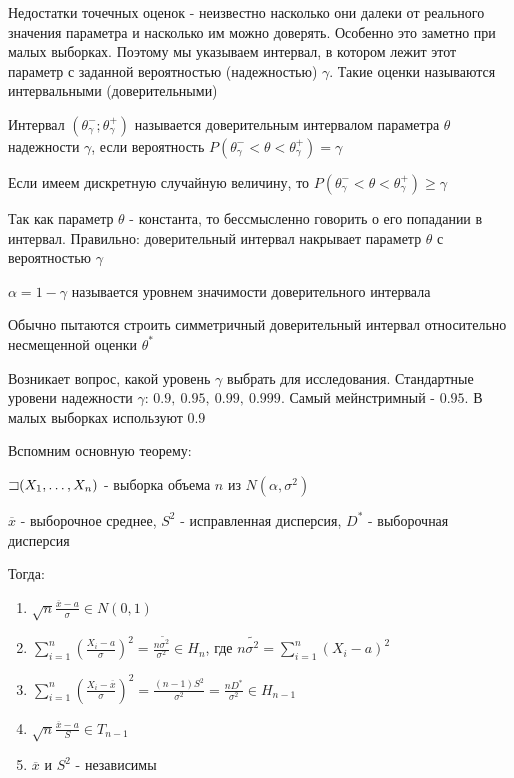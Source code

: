 \documentclass[12pt]{article}
\begin{document}
Недостатки точечных оценок - неизвестно насколько они далеки от реального значения параметра и 
насколько им можно доверять. Особенно это заметно при малых выборках. Поэтому мы указываем интервал, в котором 
лежит этот параметр с заданной вероятностью (надежностью) $\gamma$. Такие оценки называются интервальными 
(доверительными)

\Def Интервал $(\theta^-_\gamma; \theta^+_\gamma)$ называется доверительным интервалом параметра $\theta$
надежности $\gamma$, если вероятность $P(\theta^-_\gamma < \theta < \theta^+_\gamma) = \gamma$

\Nota Если имеем дискретную случайную величину, то $P(\theta^-_\gamma < \theta < \theta^+_\gamma) \geq \gamma$

\Notas Так как параметр $\theta$ - константа, то бессмысленно говорить о его попадании в интервал. Правильно: 
доверительный интервал накрывает параметр $\theta$ с вероятностью $\gamma$

 $\alpha = 1 - \gamma$ называется уровнем значимости доверительного интервала

 Обычно пытаются строить симметричный доверительный интервал относительно несмещенной оценки $\theta^*$

 Возникает вопрос, какой уровень $\gamma$ выбрать для исследования.
Стандартные уровени надежности $\gamma$: $0.9, \ 0.95, \ 0.99, \ 0.999$. Самый мейнстримный - $0.95$. 
В малых выборках используют $0.9$

Вспомним основную теорему:

\begin{MyTheorem}
    $\mathord{\sqsupset} (X_1, \dots, X_n)$ - выборка объема $n$ из $N(\alpha, \sigma^2)$

    $\overline{x}$ - выборочное среднее, $S^2$ - исправленная дисперсия, $D^*$ - выборочная дисперсия

    Тогда:

    \begin{enumerate}
        \item $\sqrt{n} \frac{\overline{x} - a}{\sigma} \in N(0, 1)$
        \item $\sum_{i = 1}^n \left(\frac{X_i - a}{\sigma}\right)^2 = \frac{n \tilde{\sigma^2}}{\sigma^2} \in H_n$, 
        где $n \tilde{\sigma^2} = \sum_{i = 1}^n (X_i - a)^2$
        \item $\sum_{i = 1}^n \left(\frac{X_i - \overline{x}}{\sigma}\right)^2 = \frac{(n - 1)S^2}{\sigma^2} = 
        \frac{nD^*}{\sigma^2} \in H_{n - 1}$
        \item $\sqrt{n} \frac{\overline{x} - a}{S} \in T_{n - 1}$
        \item $\overline{x}$ и $S^2$ - независимы
    \end{enumerate}
\end{MyTheorem}
\end{document}
